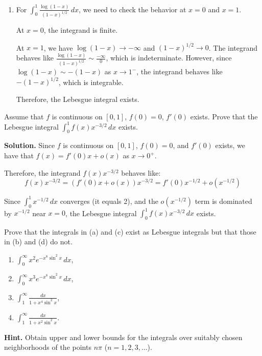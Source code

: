\begin{enumerate}[label=(\alph*)]
    \item For $\int_{0}^{1} \frac{\log (1 - x)}{(1 - x)^{1/2}} \, dx$, we need to check the behavior at $x = 0$ and $x = 1$.
    
    At $x = 0$, the integrand is finite.
    
    At $x = 1$, we have $\log (1 - x) \to -\infty$ and $(1 - x)^{1/2} \to 0$. The integrand behaves like $\frac{\log (1 - x)}{(1 - x)^{1/2}} \sim \frac{-\infty}{0}$, which is indeterminate. However, since $\log (1 - x) \sim -(1 - x)$ as $x \to 1^-$, the integrand behaves like $-(1 - x)^{1/2}$, which is integrable.
    
    Therefore, the Lebesgue integral exists.
\end{enumerate}

\begin{problembox}
Assume that $f$ is continuous on $[0, 1]$, $f(0) = 0$, $f'(0)$ exists. Prove that the Lebesgue integral $\int_{0}^{1} f(x)x^{-3/2} \, dx$ exists.
\end{problembox}

\noindent\textbf{Solution.}
Since $f$ is continuous on $[0, 1]$, $f(0) = 0$, and $f'(0)$ exists, we have that $f(x) = f'(0)x + o(x)$ as $x \to 0^+$.

Therefore, the integrand $f(x)x^{-3/2}$ behaves like:
\[f(x)x^{-3/2} = (f'(0)x + o(x))x^{-3/2} = f'(0)x^{-1/2} + o(x^{-1/2})\]

Since $\int_{0}^{1} x^{-1/2} \, dx$ converges (it equals 2), and the $o(x^{-1/2})$ term is dominated by $x^{-1/2}$ near $x = 0$, the Lebesgue integral $\int_{0}^{1} f(x)x^{-3/2} \, dx$ exists.

\begin{problembox}
Prove that the integrals in (a) and (c) exist as Lebesgue integrals but that those in (b) and (d) do not.
\begin{enumerate}[label=(\alph*)]
    \item $\int_{0}^{\infty} x^2 e^{-x^8 \sin^2 x} \, dx$,
    \item $\int_{0}^{\infty} x^3 e^{-x^8 \sin^2 x} \, dx$,
    \item $\int_{1}^{\infty} \frac{dx}{1 + x^4 \sin^2 x}$,
    \item $\int_{1}^{\infty} \frac{dx}{1 + x^2 \sin^2 x}.$
\end{enumerate}
\textbf{Hint.} Obtain upper and lower bounds for the integrals over suitably chosen neighborhoods of the points $n\pi$ ($n = 1, 2, 3, \ldots$).
\end{problembox}

